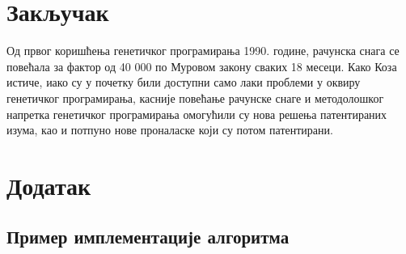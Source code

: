 \documentclass[a4paper]{article}
\begin{document}

% 
% 


\section{Закључак}
\label{sec:zakljucak}

Од првог коришћења генетичког програмирања 1990. године, рачунска снага се повећала за фактор од 40 000 по Муровом закону сваких 18 месеци. Како Коза истиче, иако су у почетку били доступни само лаки проблеми у оквиру генетичког програмирања, касније повећање рачунске снаге и методолошког напретка генетичког програмирања омогућили су нова решења патентираних изума, као и потпуно нове проналаске који су потом патентирани.

\appendix
 


\appendix
\section{Додатак}

\subsection{Пример имплементације алгоритма}
\end{document}
